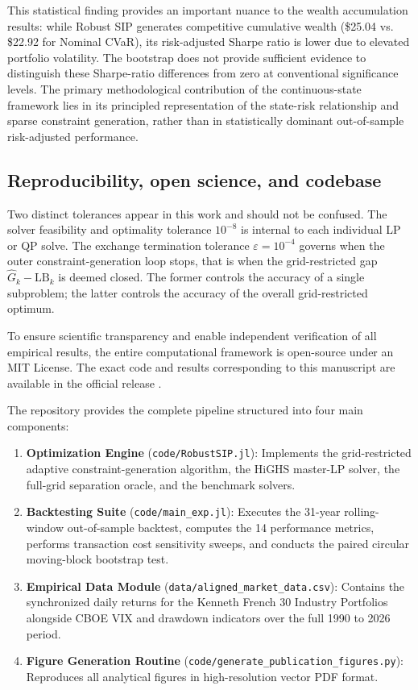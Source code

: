 \documentclass[smallcondensed]{svjour3}
\begin{document}
This statistical finding provides an important nuance to the wealth accumulation results: while Robust SIP generates competitive cumulative wealth (\$25.04 vs. \$22.92 for Nominal CVaR), its risk-adjusted Sharpe ratio is lower due to elevated portfolio volatility. The bootstrap does not provide sufficient evidence to distinguish these Sharpe-ratio differences from zero at conventional significance levels. The primary methodological contribution of the continuous-state framework lies in its principled representation of the state-risk relationship and sparse constraint generation, rather than in statistically dominant out-of-sample risk-adjusted performance.

\subsection{Reproducibility, open science, and codebase}
Two distinct tolerances appear in this work and should not be confused. The solver feasibility and optimality tolerance $10^{-8}$ is internal to each individual LP or QP solve. The exchange termination tolerance $\varepsilon = 10^{-4}$ governs when the outer constraint-generation loop stops, that is when the grid-restricted gap $\widehat G_k - \mathrm{LB}_k$ is deemed closed. The former controls the accuracy of a single subproblem; the latter controls the accuracy of the overall grid-restricted optimum.

To ensure scientific transparency and enable independent verification of all empirical results, the entire computational framework is open-source under an MIT License. The exact code and results corresponding to this manuscript are available in the official release \cite{bezoui2026robust}.

The repository provides the complete pipeline structured into four main components:
\begin{enumerate}
    \item \textbf{Optimization Engine} (\texttt{code/RobustSIP.jl}): Implements the grid-restricted adaptive constraint-generation algorithm, the HiGHS master-LP solver, the full-grid separation oracle, and the benchmark solvers.
    \item \textbf{Backtesting Suite} (\texttt{code/main\_exp.jl}): Executes the 31-year rolling-window out-of-sample backtest, computes the 14 performance metrics, performs transaction cost sensitivity sweeps, and conducts the paired circular moving-block bootstrap test.
    \item \textbf{Empirical Data Module} (\texttt{data/aligned\_market\_data.csv}): Contains the synchronized daily returns for the Kenneth French 30 Industry Portfolios \cite{french2026data} alongside CBOE VIX and drawdown indicators over the full 1990 to 2026 period.
    \item \textbf{Figure Generation Routine} (\texttt{code/}\allowbreak\texttt{generate\_publication\_figures.py}): Reproduces all analytical figures in high-resolution vector PDF format.
\end{enumerate}
\end{document}
